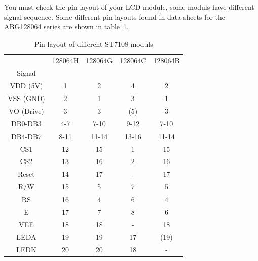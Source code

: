 You must check the pin layout of your LCD module, some moduls have different signal sequence.
Some different pin layouts found in data sheets for the ABG128064 series are shown in table~\ref{tab:ST7108types}.

\begin{table}[H]
  \begin{center}
    \begin{tabular}{| c || c | c | c | c |}
    \hline
           & 128064H  &  128064G  & 128064C  & 128064B \\
    Signal &         &          &         &         \\
    \hline
    \hline
  VDD (5V) &   1     &  2       &   4     & 2       \\
    \hline
  VSS (GND) &   2     &  1       &   3     & 1       \\
    \hline
 VO (Drive) &   3     &  3       &  (5)    & 3       \\
    \hline
  DB0-DB3   &   4-7   &  7-10    &   9-12  & 7-10    \\
    \hline
  DB4-DB7   &   8-11  &  11-14   &   13-16 & 11-14   \\
    \hline
  CS1       &   12    &  15      &   1     & 15      \\
  CS2       &   13    &  16      &   2     & 16      \\
    \hline
  Reset     &   14    &  17      &   -     & 17      \\
    \hline
  R/W       &   15    &  5       &   7     & 5       \\
    \hline
  RS        &   16    &  4       &   6     & 4       \\
    \hline
  E         &   17    &  7       &   8     & 6       \\
    \hline
  VEE       &   18    &  18      &   -     & 18      \\
    \hline
  LEDA      &   19    &  19      &   17    & (19)      \\
  LEDK      &   20    &  20      &   18    & -      \\
    \hline
    \end{tabular}
  \end{center}
  \caption{Pin layout of different ST7108 moduls}
  \label{tab:ST7108types}
\end{table}

